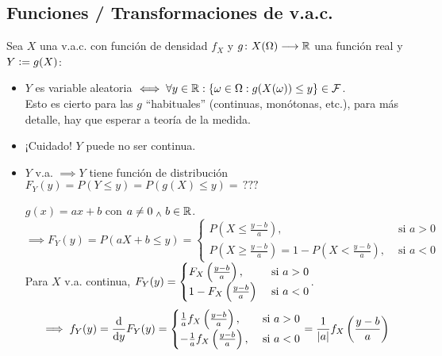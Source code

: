 \subsection{Funciones / Transformaciones de v.a.c.}
Sea $X$ una v.a.c. con función de densidad $f_X$ y $g \colon X(\Omega) \longrightarrow \mathbb{R}$ una función real y $Y\vcentcolon= g(X)$:
\begin{itemize}
	\item $Y$ es variable aleatoria $\iff \forall y \in \mathbb{R} : \{\omega \in \Omega : g(X(\omega)) \leq y\} \in \mathcal{F}$.\\
	      Esto es cierto para las $g$ ``habituales'' (continuas, monótonas, etc.), para más detalle, hay que esperar a teoría de la medida.
	\item ¡Cuidado! $Y$ puede no ser continua.
	\item $Y$ v.a. $\implies Y$ tiene función de distribución $F_Y(y) = P(Y\leq y) = P(g(X)\leq y) = \, ???$
	      \begin{ejem}
		      $g(x) = ax + b$ con $a\ne 0 \; _{\wedge} \; b \in \mathbb{R}$.
		      \[\implies F_Y(y)= P(aX+b\leq y) = \begin{cases}
				      P\left(X \leq \frac{y-b}{a}\right),                                       & \text{ si } a>0 \\
				      P\left(X \geq \frac{y-b}{a}\right) = 1 - P\left(X < \frac{y-b}{a}\right), & \text{ si } a<0
			      \end{cases}\]
		      Para $X$ v.a. continua, $\displaystyle F_Y(y) = \begin{cases}
				      F_X\left(\frac{y-b}{a}\right),  & \text{ si } a>0 \\
				      1-F_X\left(\frac{y-b}{a}\right) & \text{ si } a<0
			      \end{cases}$.
		      \[\implies f_Y(y) =\odv{}{y} F_Y(y) = \begin{cases}
				      \frac{1}{a} f_X\left(\frac{y-b}{a}\right),  & \text{ si } a>0 \\
				      -\frac{1}{a} f_X\left(\frac{y-b}{a}\right), & \text{ si } a<0
			      \end{cases} = \frac{1}{\abs{a}} f_X\left(\frac{y-b}{a}\right)\]
	      \end{ejem}
\end{itemize}

